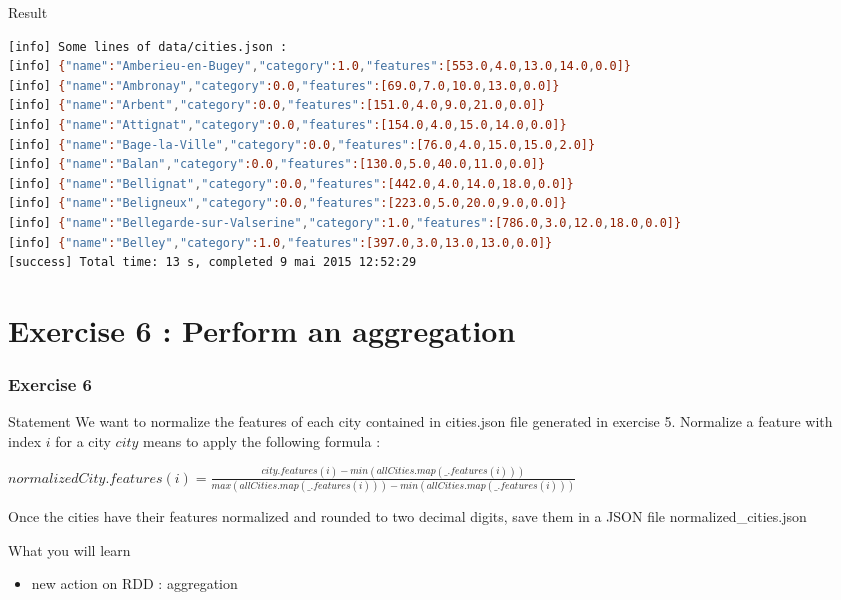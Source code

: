 \documentclass[slidetop,9pt,utf8]{beamer}
\begin{document}
\begin{CJK}{UTF8}{gbsn}
\begin{frame}[fragile]
  \begin{block}{Result}
    \begin{lstlisting}[language=bash, style=terminal]
[info] Some lines of data/cities.json : 
[info] {"name":"Amberieu-en-Bugey","category":1.0,"features":[553.0,4.0,13.0,14.0,0.0]}
[info] {"name":"Ambronay","category":0.0,"features":[69.0,7.0,10.0,13.0,0.0]}
[info] {"name":"Arbent","category":0.0,"features":[151.0,4.0,9.0,21.0,0.0]}
[info] {"name":"Attignat","category":0.0,"features":[154.0,4.0,15.0,14.0,0.0]}
[info] {"name":"Bage-la-Ville","category":0.0,"features":[76.0,4.0,15.0,15.0,2.0]}
[info] {"name":"Balan","category":0.0,"features":[130.0,5.0,40.0,11.0,0.0]}
[info] {"name":"Bellignat","category":0.0,"features":[442.0,4.0,14.0,18.0,0.0]}
[info] {"name":"Beligneux","category":0.0,"features":[223.0,5.0,20.0,9.0,0.0]}
[info] {"name":"Bellegarde-sur-Valserine","category":1.0,"features":[786.0,3.0,12.0,18.0,0.0]}
[info] {"name":"Belley","category":1.0,"features":[397.0,3.0,13.0,13.0,0.0]}
[success] Total time: 13 s, completed 9 mai 2015 12:52:29
    \end{lstlisting}
  \end{block}

\end{frame}


\section{Exercise 6 : Perform an aggregation}

\begin{frame}
  \frametitle{Exercise 6}

  \begin{block}{Statement}
    We want to normalize the features of each city contained in cities.json file generated in exercise 5. Normalize a feature with index $i$ for a city $city$ means to apply the following formula :
\begin{center} 
    $normalizedCity.features(i) = \frac{city.features(i) - min(allCities.map(\_.features(i)))}{max(allCities.map(\_.features(i))) - min(allCities.map(\_.features(i)))}$
\end{center}
Once the cities have their features normalized and rounded to two decimal digits, save them in a JSON file normalized\_cities.json
  \end{block}

  \begin{block}{What you will learn}
    \begin{itemize}
      \item new action on RDD : aggregation
    \end{itemize}
  \end{block}


\end{frame}
\end{CJK}
\end{document}
